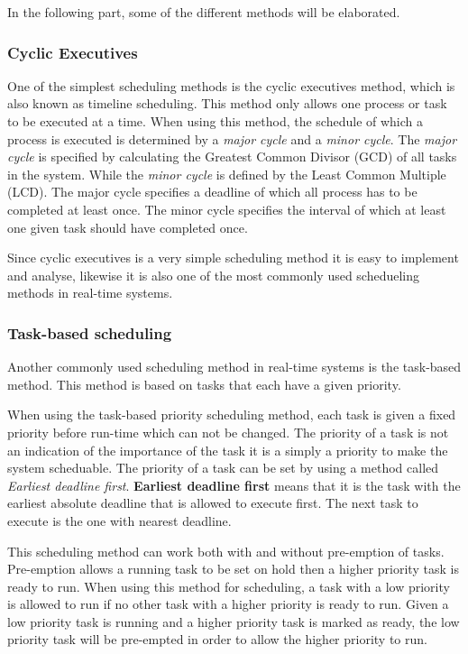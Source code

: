 In the following part, some of the different methods will be elaborated. 

\subsubsection{Cyclic Executives}
One of the simplest scheduling methods is the cyclic executives method, which is also known as timeline scheduling.
This method only allows one process or task to be executed at a time. 
When using this method, the schedule of which a process is executed is determined by a \textit{major cycle} and a \textit{minor cycle}.
The \textit{major cycle} is specified by calculating the Greatest Common Divisor (GCD) of all tasks in the system.
While the \textit{minor cycle} is defined by the Least Common Multiple (LCD). 
The major cycle specifies a deadline of which all process has to be completed at least once.
The minor cycle specifies the interval of which at least one given task should have completed once. 

Since cyclic executives is a very simple scheduling method it is easy to implement and analyse, likewise it is also one of the most commonly used schedueling methods in real-time systems\cite{RealTimeEmbeddedSystems}. 

\subsubsection{Task-based scheduling}
Another commonly used scheduling method in real-time systems is the task-based method. 
This method is based on tasks that each have a given priority.

When using the task-based priority scheduling method, each task is given a fixed priority before run-time which can not be changed.
The priority of a task is not an indication of the importance of the task it is a simply a priority to make the system scheduable. 
The priority of a task can be set by using a method called \textit{Earliest deadline first}.
\textbf{Earliest deadline first} means that it is the task with the earliest absolute deadline that is allowed to execute first.
The next task to execute is the one with nearest deadline.

This scheduling method can work both with and without pre-emption of tasks.
Pre-emption allows a running task to be set on hold then a higher priority task is ready to run. 
When using this method for scheduling, a task with a low priority is allowed to run if no other task with a higher priority is ready to run. 
Given a low priority task is running and a higher priority task is marked as ready, the low priority task will be pre-empted in order to allow the higher priority to run.